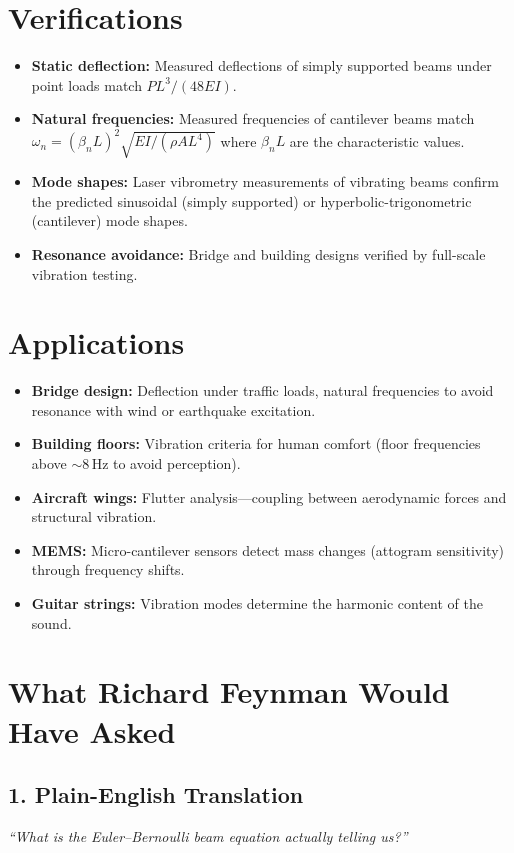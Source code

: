 \section*{Verifications}

\begin{itemize}
\item \textbf{Static deflection:} Measured deflections of simply supported beams under point loads match $PL^3/(48EI)$.
\item \textbf{Natural frequencies:} Measured frequencies of cantilever beams match $\omega_n = (\beta_n L)^2 \sqrt{EI/(\rho A L^4)}$ where $\beta_n L$ are the characteristic values.
\item \textbf{Mode shapes:} Laser vibrometry measurements of vibrating beams confirm the predicted sinusoidal (simply supported) or hyperbolic-trigonometric (cantilever) mode shapes.
\item \textbf{Resonance avoidance:} Bridge and building designs verified by full-scale vibration testing.
\end{itemize}
\section*{Applications}

\begin{itemize}
\item \textbf{Bridge design:} Deflection under traffic loads, natural frequencies to avoid resonance with wind or earthquake excitation.
\item \textbf{Building floors:} Vibration criteria for human comfort (floor frequencies above $\sim$8\,Hz to avoid perception).
\item \textbf{Aircraft wings:} Flutter analysis---coupling between aerodynamic forces and structural vibration.
\item \textbf{MEMS:} Micro-cantilever sensors detect mass changes (attogram sensitivity) through frequency shifts.
\item \textbf{Guitar strings:} Vibration modes determine the harmonic content of the sound.
\end{itemize}
\section*{What Richard Feynman Would Have Asked}

\subsection*{1. Plain-English Translation}
\textit{``What is the Euler--Bernoulli beam equation actually telling us?''}

